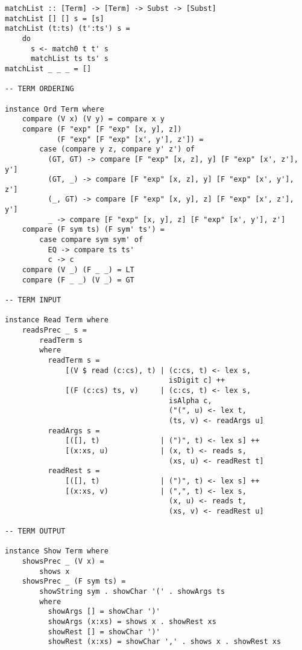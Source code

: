 \documentclass[12pt]{article}
\begin{document}
\begin{verbatim}
matchList :: [Term] -> [Term] -> Subst -> [Subst]
matchList [] [] s = [s]
matchList (t:ts) (t':ts') s =
    do
      s <- match0 t t' s
      matchList ts ts' s
matchList _ _ _ = []

-- TERM ORDERING

instance Ord Term where
    compare (V x) (V y) = compare x y
    compare (F "exp" [F "exp" [x, y], z])
            (F "exp" [F "exp" [x', y'], z']) =
        case (compare y z, compare y' z') of
          (GT, GT) -> compare [F "exp" [x, z], y] [F "exp" [x', z'], y']
          (GT, _) -> compare [F "exp" [x, z], y] [F "exp" [x', y'], z']
          (_, GT) -> compare [F "exp" [x, y], z] [F "exp" [x', z'], y']
          _ -> compare [F "exp" [x, y], z] [F "exp" [x', y'], z']
    compare (F sym ts) (F sym' ts') =
        case compare sym sym' of
          EQ -> compare ts ts'
          c -> c
    compare (V _) (F _ _) = LT
    compare (F _ _) (V _) = GT

-- TERM INPUT

instance Read Term where
    readsPrec _ s =
        readTerm s
        where
          readTerm s =
              [(V $ read (c:cs), t) | (c:cs, t) <- lex s,
                                      isDigit c] ++
              [(F (c:cs) ts, v)     | (c:cs, t) <- lex s,
                                      isAlpha c,
                                      ("(", u) <- lex t,
                                      (ts, v) <- readArgs u]
          readArgs s =
              [([], t)              | (")", t) <- lex s] ++
              [(x:xs, u)            | (x, t) <- reads s,
                                      (xs, u) <- readRest t]
          readRest s =
              [([], t)              | (")", t) <- lex s] ++
              [(x:xs, v)            | (",", t) <- lex s,
                                      (x, u) <- reads t,
                                      (xs, v) <- readRest u]

-- TERM OUTPUT

instance Show Term where
    showsPrec _ (V x) =
        shows x
    showsPrec _ (F sym ts) =
        showString sym . showChar '(' . showArgs ts
        where
          showArgs [] = showChar ')'
          showArgs (x:xs) = shows x . showRest xs
          showRest [] = showChar ')'
          showRest (x:xs) = showChar ',' . shows x . showRest xs
\end{verbatim}
\endgroup
\end{document}

